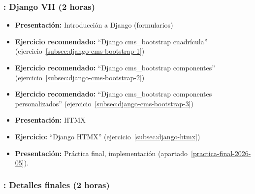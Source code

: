 \documentclass[a4paper,12pt]{article}
\begin{document}
\subsubsection{\juevesM: Django VII (2 horas)}
\label{cal:juevesM}

\begin{itemize}
  \item \textbf{Presentación:} Introducción a Django (formularios)
  \item \textbf{Ejercicio recomendado:} ``Django cms\_bootstrap cuadrícula'' (ejercicio~\ref{subsec:django-cms-bootstrap-1})
   \item \textbf{Ejercicio recomendado:} ``Django cms\_bootstrap componentes'' (ejercicio~\ref{subsec:django-cms-bootstrap-2})
   \item \textbf{Ejercicio recomendado:} ``Django cms\_bootstrap componentes personalizados'' (ejercicio~\ref{subsec:django-cms-bootstrap-3})
   \item \textbf{Presentación:} HTMX
   \item \textbf{Ejercicio:} ``Django HTMX'' (ejercicio~\ref{subsec:django-htmx})
\item \textbf{Presentación:} Práctica final, implementación (apartado~\ref{practica-final-2026-05}).
\end{itemize}


\subsubsection{\juevesN: Detalles finales  (2 horas)}
\label{cal:juevesN}

\end{document}
